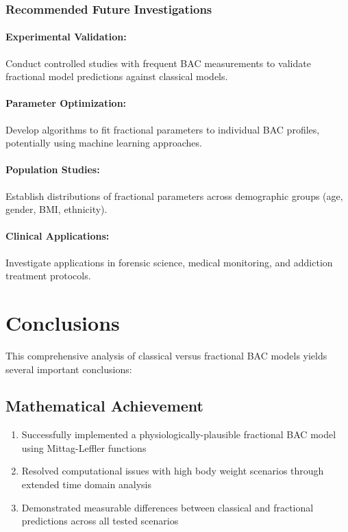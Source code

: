\documentclass[12pt]{article}
\begin{document}
\subsubsection{Recommended Future Investigations}

\paragraph{Experimental Validation:} Conduct controlled studies with frequent BAC measurements to validate fractional model predictions against classical models.

\paragraph{Parameter Optimization:} Develop algorithms to fit fractional parameters to individual BAC profiles, potentially using machine learning approaches.

\paragraph{Population Studies:} Establish distributions of fractional parameters across demographic groups (age, gender, BMI, ethnicity).

\paragraph{Clinical Applications:} Investigate applications in forensic science, medical monitoring, and addiction treatment protocols.

\section{Conclusions}

This comprehensive analysis of classical versus fractional BAC models yields several important conclusions:

\subsection{Mathematical Achievement}

\begin{enumerate}
    \item Successfully implemented a physiologically-plausible fractional BAC model using Mittag-Leffler functions
    \item Resolved computational issues with high body weight scenarios through extended time domain analysis
    \item Demonstrated measurable differences between classical and fractional predictions across all tested scenarios
\end{enumerate}
\end{document}
